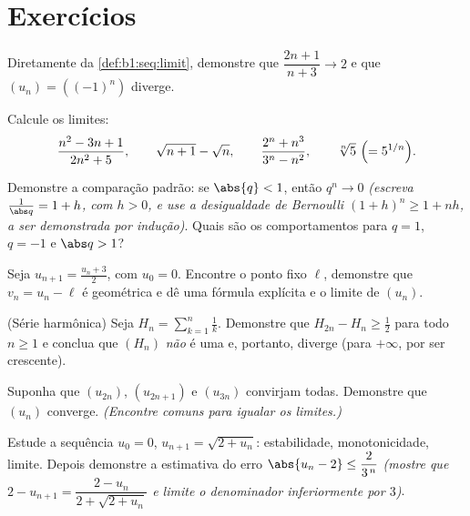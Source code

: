 \section{Exercícios}

\begin{exercise}[$\star$]\label{exo:b1:seq:1}
Diretamente da \cref{def:b1:seq:limit}, demonstre que
$\dfrac{2n+1}{n+3} \to 2$ e que $(u_n) = ((-1)^n)$ diverge.
\end{exercise}

\begin{exercise}[$\star$]\label{exo:b1:seq:2}
Calcule os limites:
\[
\frac{n^2 - 3n + 1}{2n^2 + 5},
\qquad
\sqrt{n+1} - \sqrt n,
\qquad
\frac{2^n + n^3}{3^n - n^2},
\qquad
\sqrt[n]{5}\ \Bigl(= 5^{1/n}\Bigr).
\]
\end{exercise}

\begin{exercise}[$\star$]\label{exo:b1:seq:3}
Demonstre a comparação padrão: se $\abs{q} < 1$, então $q^n \to 0$
\emph{(escreva $\frac{1}{\abs q} = 1 + h$, com $h > 0$, e use a
desigualdade de Bernoulli $(1+h)^n \geq 1 + nh$, a ser demonstrada por
indução)}. Quais são os comportamentos para $q = 1$, $q = -1$ e $\abs q >
1$?
\end{exercise}

\begin{exercise}[$\star$]\label{exo:b1:seq:4}
Seja $u_{n+1} = \frac{u_n + 3}{2}$, com $u_0 = 0$. Encontre o ponto fixo
$\ell$, demonstre que $v_n = u_n - \ell$ é geométrica e dê uma
fórmula explícita e o limite de $(u_n)$.
\end{exercise}

\begin{exercise}[$\star\star$]\label{exo:b1:seq:5}
(Série harmônica) Seja $H_n = \sum_{k=1}^{n} \frac 1k$. Demonstre que
$H_{2n} - H_n \geq \frac12$ para todo $n \geq 1$ e conclua que
$(H_n)$ \emph{não} é uma  e, portanto, diverge (para
$+\infty$, por ser crescente).
\end{exercise}

\begin{exercise}[$\star\star$]\label{exo:b1:seq:6}
Suponha que $(u_{2n})$, $(u_{2n+1})$ e $(u_{3n})$ convirjam todas.
Demonstre que $(u_n)$ converge. \emph{(Encontre  comuns
para igualar os limites.)}
\end{exercise}

\begin{exercise}[$\star\star$]\label{exo:b1:seq:7}
Estude a sequência $u_0 = 0$, $u_{n+1} = \sqrt{2 + u_n}$:
estabilidade, monotonicidade, limite. Depois demonstre a estimativa do
erro $\abs{u_n - 2} \leq \dfrac{2}{3^{\,n}}$ \emph{(mostre que $2 - u_{n+1} =
\dfrac{2 - u_n}{2 + \sqrt{2 + u_n}}$ e limite o denominador inferiormente
por $3$)}.
\end{exercise}

